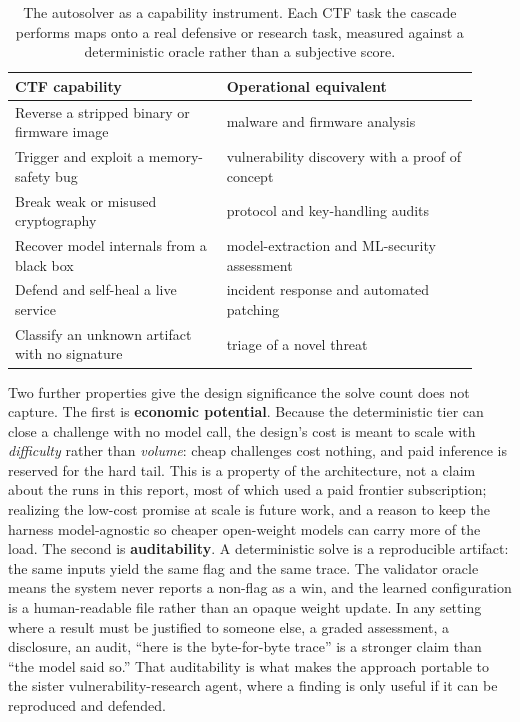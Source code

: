 \documentclass[10pt,twocolumn]{article}
\begin{document}
\begin{table}[t]
  \centering\small
  \setlength{\tabcolsep}{6pt}\renewcommand{\arraystretch}{1.2}
  \begin{tabular}{@{}p{0.42\linewidth} p{0.50\linewidth}@{}}
    \toprule
    \textbf{CTF capability} & \textbf{Operational equivalent} \\
    \midrule
    Reverse a stripped binary or firmware image & malware and firmware analysis \\
    Trigger and exploit a memory-safety bug     & vulnerability discovery with a proof of concept \\
    Break weak or misused cryptography          & protocol and key-handling audits \\
    Recover model internals from a black box    & model-extraction and ML-security assessment \\
    Defend and self-heal a live service         & incident response and automated patching \\
    Classify an unknown artifact with no signature & triage of a novel threat \\
    \bottomrule
  \end{tabular}
  \caption{The autosolver as a capability instrument. Each CTF task the cascade performs maps onto a real
  defensive or research task, measured against a deterministic oracle rather than a subjective score.}
  \label{tab:beyond}
\end{table}

Two further properties give the design significance the solve count does not capture. The first is
\textbf{economic potential}. Because the deterministic tier can close a challenge with no model call, the
design's cost is meant to scale with \emph{difficulty} rather than \emph{volume}: cheap challenges cost
nothing, and paid inference is reserved for the hard tail. This is a property of the architecture, not a
claim about the runs in this report, most of which used a paid frontier subscription; realizing the low-cost
promise at scale is future work, and a reason to keep the harness model-agnostic so cheaper open-weight models
can carry more of the load. The second is \textbf{auditability}. A deterministic solve is a reproducible artifact: the same
inputs yield the same flag and the same trace. The validator oracle means the system never reports a non-flag
as a win, and the learned configuration is a human-readable file rather than an opaque weight update. In any
setting where a result must be justified to someone else, a graded assessment, a disclosure, an audit, ``here
is the byte-for-byte trace'' is a stronger claim than ``the model said so.'' That auditability is what makes
the approach portable to the sister vulnerability-research agent, where a finding is only useful if it can be
reproduced and defended.
\end{document}
